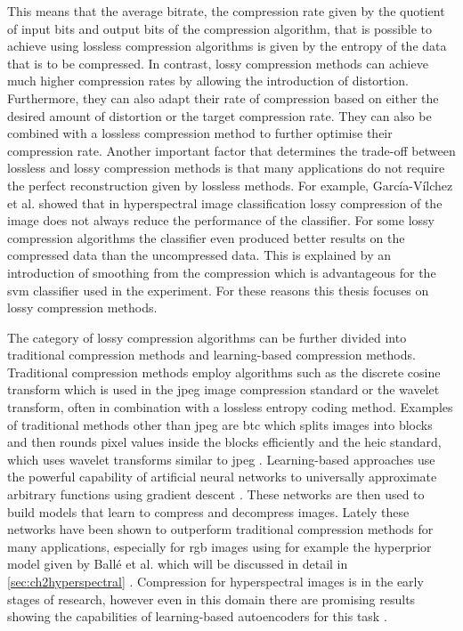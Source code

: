 This means that the average bitrate, the compression rate given by the quotient of input bits and output bits of the compression algorithm, that is possible to achieve using lossless compression algorithms is given by the entropy of the data that is to be compressed.
In contrast, lossy compression methods can achieve much higher compression rates by allowing the introduction of distortion. Furthermore, they can also adapt their rate of compression based on either the desired amount of distortion or the target compression rate. They can also be combined with a lossless compression method to further optimise their compression rate. 
Another important factor that determines the trade-off between lossless and lossy compression methods is that many applications do not require the perfect reconstruction given by lossless methods. For example, García-Vílchez et al. \citep{garcia-vilchez_impact_2011} showed that in hyperspectral image classification lossy compression of the image does not always reduce the performance of the classifier. For some lossy compression algorithms the classifier even produced better results on the compressed data than the uncompressed data. This is explained by an introduction of smoothing from the compression which is advantageous for the \ac{svm} classifier used in the experiment. 
For these reasons this thesis focuses on lossy compression methods.

The category of lossy compression algorithms can be further divided into traditional compression methods and learning-based compression methods. Traditional compression methods employ algorithms such as the discrete cosine transform which is used in the \ac{jpeg} image compression standard or the wavelet transform, often in combination with a lossless entropy coding method. Examples of traditional methods other than \ac{jpeg} are \ac{btc} which splits images into blocks and then rounds pixel values inside the blocks efficiently and the \ac{heic} standard, which uses wavelet transforms similar to \ac{jpeg} \citep{delp_image_1979,hannuksela_high_2015}. Learning-based approaches use the powerful capability of artificial neural networks to universally approximate arbitrary functions using gradient descent \citep{ruder_overview_2017}. These networks are then used to build models that learn to compress and decompress images. Lately these networks have been shown to outperform traditional compression methods for many applications, especially for \ac{rgb} images using for example the hyperprior model given by Ballé et al. which will be discussed in detail in \autoref{sec:ch2hyperspectral} \citep{balle_end--end_2017,balle_variational_2018,minnen_joint_2018}. 
Compression for hyperspectral images is in the early stages of research, however even in this domain there are promising results showing the capabilities of learning-based autoencoders for this task \citep{kuester_1d-convolutional_2021,kuester_transferability_2022,la_grassa_hyperspectral_2022,guo_learned_2021}.

